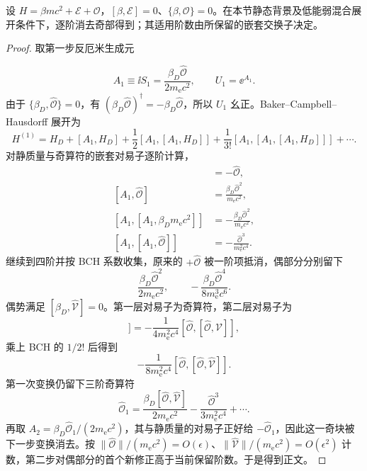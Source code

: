 \begin{proposition}[偶奇算符的二阶块对角化]
设 $H=\beta mc^2+\mathcal E+\mathcal O$，$[\beta,\mathcal E]=0$、$\{\beta,\mathcal O\}=0$。在本节静态背景及低能弱混合展开条件下，逐阶消去奇部得到；其适用阶数由所保留的嵌套交换子决定。
\end{proposition}
\begin{proof}
取第一步反厄米生成元

\begin{equation*}
 A_1\equiv\ii S_1=\frac{\beta_D\hat{\mathcal O}}{2m_{\mathrm e} c^2},
 \qquad U_1=\ee^{A_1}.
\end{equation*}
由于 $\{\beta_D,\hat{\mathcal O}\}=0$，有 $(\beta_D\hat{\mathcal O})^\dagger=-\beta_D\hat{\mathcal O}$，所以 $U_1$ 幺正。Baker--Campbell--Hausdorff 展开为
\begin{equation*}
 H^{(1)}=H_D+[A_1,H_D]
 +\frac12[A_1,[A_1,H_D]]
 +\frac1{3!}[A_1,[A_1,[A_1,H_D]]]+\cdots .
\end{equation*}
对静质量与奇算符的嵌套对易子逐阶计算，
\begin{align*}
 [A_1,\beta_Dm_{\mathrm e} c^2]&=-\hat{\mathcal O},\\
 [A_1,\hat{\mathcal O}]&=\frac{\beta_D\hat{\mathcal O}^2}{m_{\mathrm e} c^2},\\
 [A_1,[A_1,\beta_Dm_{\mathrm e} c^2]]&=-\frac{\beta_D\hat{\mathcal O}^2}{m_{\mathrm e} c^2},\\
 [A_1,[A_1,\hat{\mathcal O}]]&=-\frac{\hat{\mathcal O}^3}{m_{\mathrm e}^2c^4}.
\end{align*}
继续到四阶并按 BCH 系数收集，原来的 $+\hat{\mathcal O}$ 被一阶项抵消，偶部分分别留下
\begin{equation*}
 \frac{\beta_D\hat{\mathcal O}^2}{2m_{\mathrm e} c^2},
 \qquad
 -\frac{\beta_D\hat{\mathcal O}^4}{8m_{\mathrm e}^3c^6}.
\end{equation*}
偶势满足 $[\beta_D,\hat{\mathcal V}]=0$。第一层对易子为奇算符，第二层对易子为
\begin{equation*}
 [A_1,[A_1,\hat{\mathcal V}]]
 =-\frac{1}{4m_{\mathrm e}^2c^4}[\hat{\mathcal O},[\hat{\mathcal O},\hat{\mathcal V}]],
\end{equation*}
乘上 BCH 的 $1/2!$ 后得到
\begin{equation*}
 -\frac{1}{8m_{\mathrm e}^2c^4}[\hat{\mathcal O},[\hat{\mathcal O},\hat{\mathcal V}]].
\end{equation*}
第一次变换仍留下三阶奇算符
\begin{equation*}
 \hat{\mathcal O}_1
 =\frac{\beta_D[\hat{\mathcal O},\hat{\mathcal V}]}{2m_{\mathrm e} c^2}
 -\frac{\hat{\mathcal O}^3}{3m_{\mathrm e}^2c^4}+\cdots .
\end{equation*}
再取 $A_2=\beta_D\hat{\mathcal O}_1/(2m_{\mathrm e} c^2)$，其与静质量的对易子正好给 $-\hat{\mathcal O}_1$，因此这一奇块被下一步变换消去。按 $\|\hat{\mathcal O}\|/(m_{\mathrm e} c^2)=O(\epsilon)$、$\|\hat{\mathcal V}\|/(m_{\mathrm e} c^2)=O(\epsilon^2)$ 计数，第二步对偶部分的首个新修正高于当前保留阶数。于是得到正文。
\end{proof}

